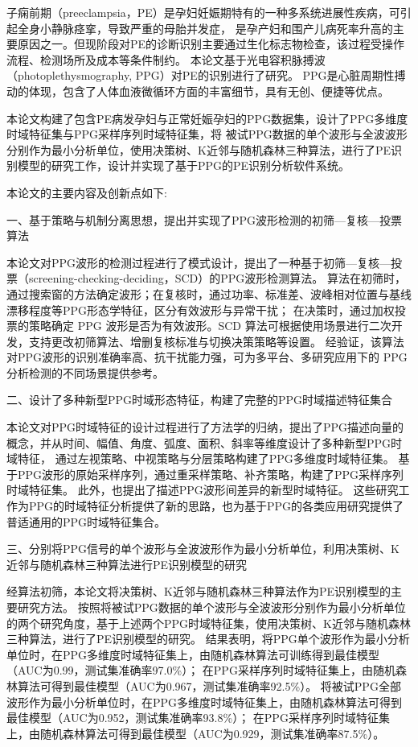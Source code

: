 \cleardoublepage
{}
子痫前期（preeclampsia，PE）是孕妇妊娠期特有的一种多系统进展性疾病，可引起全身小静脉痉挛，导致严重的母胎并发症，
是孕产妇和围产儿病死率升高的主要原因之一。但现阶段对PE的诊断识别主要通过生化标志物检查，该过程受操作流程、检测场所及成本等条件制约。
本论文基于光电容积脉搏波（photoplethysmography, PPG）对PE的识别进行了研究。
PPG是心脏周期性搏动的体现，包含了人体血液微循环方面的丰富细节，具有无创、便捷等优点。

本论文构建了包含PE病发孕妇与正常妊娠孕妇的PPG数据集，设计了PPG多维度时域特征集与PPG采样序列时域特征集，将
被试PPG数据的单个波形与全波波形分别作为最小分析单位，使用决策树、K近邻与随机森林三种算法，进行了PE识别模型的研究工作，设计并实现了基于PPG的PE识别分析软件系统。

本论文的主要内容及创新点如下:

一、基于策略与机制分离思想，提出并实现了PPG波形检测的初筛—复核—投票算法

本论文对PPG波形的检测过程进行了模式设计，提出了一种基于初筛—复核—投票（screening-checking-deciding，SCD）的PPG波形检测算法。
算法在初筛时，通过搜索窗的方法确定波形；在复核时，通过功率、标准差、波峰相对位置与基线漂移程度等PPG形态学特征，区分有效波形与异常干扰；
在决策时，通过加权投票的策略确定 PPG 波形是否为有效波形。SCD 算法可根据使用场景进行二次开发，支持更改初筛算法、增删复核标准与切换决策策略等设置。
经验证，该算法对PPG波形的识别准确率高、抗干扰能力强，可为多平台、多研究应用下的 PPG 分析检测的不同场景提供参考。

二、设计了多种新型PPG时域形态特征，构建了完整的PPG时域描述特征集合

本论文对PPG时域特征的设计过程进行了方法学的归纳，提出了PPG描述向量的概念，并从时间、幅值、角度、弧度、面积、斜率等维度设计了多种新型PPG时域特征，
通过左视策略、中视策略与分层策略构建了PPG多维度时域特征集。
基于PPG波形的原始采样序列，通过重采样策略、补齐策略，构建了PPG采样序列时域特征集。
此外，也提出了描述PPG波形间差异的新型时域特征。
这些研究工作为PPG的时域特征分析提供了新的思路，也为基于PPG的各类应用研究提供了普适通用的PPG时域特征集合。

三、分别将PPG信号的单个波形与全波波形作为最小分析单位，利用决策树、K 近邻与随机森林三种算法进行PE识别模型的研究

经算法初筛，本论文将决策树、K近邻与随机森林三种算法作为PE识别模型的主要研究方法。
按照将被试PPG数据的单个波形与全波波形分别作为最小分析单位的两个研究角度，基于上述两个PPG时域特征集，使用决策树、K近邻与随机森林三种算法，进行了PE识别模型的研究。
结果表明，将PPG单个波形作为最小分析单位时，在PPG多维度时域特征集上，由随机森林算法可训练得到最佳模型（AUC为0.99，测试集准确率97.0\%）；
在PPG采样序列时域特征集上，由随机森林算法可得到最佳模型（AUC为0.967，测试集准确率92.5\%）。
将被试PPG全部波形作为最小分析单位时，在PPG多维度时域特征集上，由随机森林算法可得到最佳模型（AUC为0.952，测试集准确率93.8\%）；
在PPG采样序列时域特征集上，由随机森林算法可得到最佳模型（AUC为0.929，测试集准确率87.5\%）。

